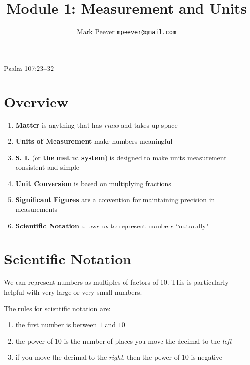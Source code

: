 \documentclass[11pt, oneside]{article}   	%
\title{Module 1: Measurement and Units}
\author{Mark Peever \texttt{mpeever@gmail.com}}
\begin{document}
\maketitle

\begin{center}
Psalm 107:23--32
\end{center}

\section{Overview}

\begin{enumerate}
\item \textbf{Matter} is anything that has \emph{mass} and takes up space
\item \textbf{Units of Measurement} make numbers meaningful
\item \textbf{S. I.} (or \textbf{the metric system}) is designed to make units measurement consistent and simple
\item \textbf{Unit Conversion} is based on multiplying fractions
\item \textbf{Significant Figures} are a convention for maintaining precision in measurements
\item \textbf{Scientific Notation} allows us to represent numbers ``naturally"   
\end{enumerate}

\section{Scientific Notation}
We can represent numbers as multiples of factors of 10.
This is particularly helpful with very large or very small numbers.

The rules for scientific notation are:
\begin{enumerate}
\item the first number is between $ 1 $ and $ 10 $
\item  the power of $ 10 $ is the number of places you move the decimal to the \emph{left}
\item if you move the decimal to the \emph{right}, then the power of $ 10 $ is negative
\end{enumerate}
\end{document}
